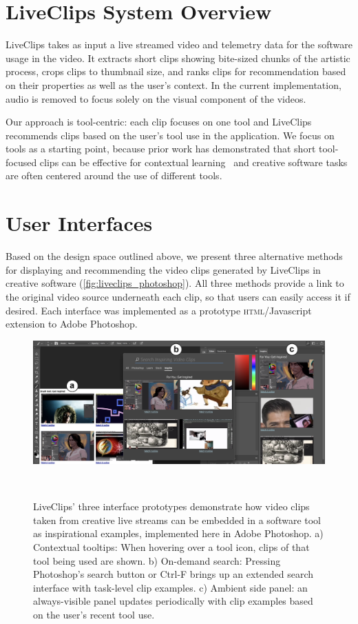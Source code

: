 \section{LiveClips System Overview}

LiveClips takes as input a live streamed video and telemetry data for the software usage in the video. It extracts short clips showing bite-sized chunks of the artistic process, crops clips to thumbnail size, and ranks clips for recommendation based on their properties as well as the user's context. In the current implementation, audio is removed to focus solely on the visual component of the videos. %

Our approach is tool-centric: each clip focuses on one tool and LiveClips recommends clips based on the user's tool use in the application. We focus on tools as a starting point, because prior work has demonstrated that short tool-focused clips can be effective for contextual learning~\cite{Grossman2010a} and creative software tasks are often centered around the use of different tools.

\section{User Interfaces}
Based on the design space outlined above, we present three alternative methods for displaying and recommending the video clips generated by LiveClips in creative software (\autoref{fig:liveclips_photoshop}).
All three methods provide a link to the original video source underneath each clip, so that users can easily access it if desired. Each interface was implemented as a prototype \textsc{html}/Javascript extension to Adobe Photoshop.

\begin{figure}[t!]
\centering
  \includegraphics[width=\textwidth]{liveclips/figures/all_interfaces.png}
  \caption[LiveClips' three interface prototypes demonstrate how video clips taken from creative live streams can be embedded in a software tool as inspirational examples, implemented here in Adobe Photoshop.]{LiveClips' three interface prototypes demonstrate how video clips taken from creative live streams can be embedded in a software tool as inspirational examples, implemented here in Adobe Photoshop. a) Contextual tooltips: When hovering over a tool icon, clips of that tool being used are shown. b) On-demand search: Pressing Photoshop's search button or Ctrl-F brings up an extended search interface with task-level clip examples. c) Ambient side panel: an always-visible panel updates periodically with clip examples based on the user's recent tool use. }~\label{fig:liveclips_photoshop}
\end{figure}

